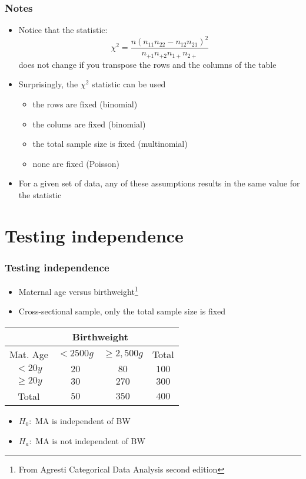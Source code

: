 \documentclass[aspectratio=169]{beamer}
\begin{document}
\begin{frame}\frametitle{Notes}
\begin{itemize}
\item Notice that the statistic:
$$
\chi^2 = \frac{n(n_{11} n_{22} - n_{12}n_{21})^2}{n_{+1} n_{+2} n_{1+} n_{2+}}
$$
does not change if you transpose the rows and the columns of the table
\item Surprisingly, the $\chi^2$ statistic can be used 
  \begin{itemize}
  \item the rows are fixed (binomial)
  \item the colums are fixed (binomial)
  \item the total sample size is fixed (multinomial)
  \item none are fixed (Poisson) 
  \end{itemize}
\item For a given set of data, any of these assumptions results
  in the same value for the statistic
\end{itemize}
\end{frame}

\section{Testing independence}
\begin{frame}\frametitle{Testing independence}
\begin{itemize}
\item Maternal age versus birthweight\footnote{From Agresti Categorical Data Analysis second edition}
\item Cross-sectional sample, only the total sample size is fixed
\end{itemize}
\begin{center}
\begin{tabular}{|c|c|c|c|} \hline
          & \multicolumn{2}{c}{Birthweight} & \\ \hline
Mat. Age  & $<2500g$ & $\geq 2,500g$ & Total \\ \hline
$< 20 y$    & $20$   & $80$  & $100$ \\   
$\geq 20 y$ & $30$   & $270$ & $300$ \\   \hline
Total       & $50$   & $350$ & $400$ \\   \hline
\end{tabular}
\end{center}
\begin{itemize}
\item $H_0:$ MA is independent of BW
\item $H_a:$ MA is not independent of BW
\end{itemize}
\end{frame}
\end{document}
